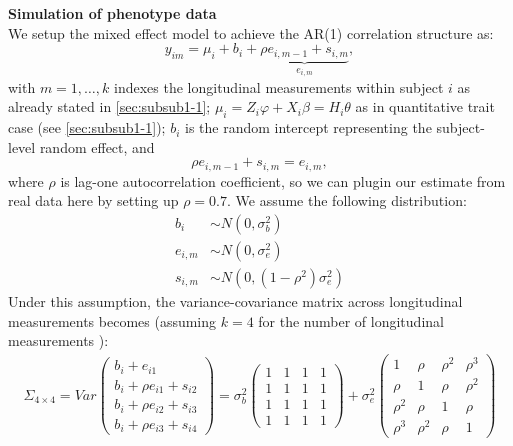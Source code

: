 \documentclass[compress]{beamer}
\begin{document}
\begin{frame}[allowframebreaks]
\framebreak
\textbf{Simulation of phenotype data}\\
We setup the mixed effect model to achieve the AR(1) correlation structure as:\\
\begin{equation}
y_{im} = \mu_{i} + b_i + \underbrace{ \rho e_{i,m-1} + s_{i,m} }_{ e_{i,m} }  ,
\label{eq:y_im_split}
\end{equation}
with $m = 1,\ldots,k$ indexes the longitudinal measurements within subject $i$ as already stated in \ref{sec:subsub1-1}; $\mu_{i} = Z_i \varphi + X_i \beta = H_i \theta$ as in quantitative trait case (see \ref{sec:subsub1-1}); $b_i$ is the random intercept representing the subject-level random effect, and
$$
\rho e_{i,m-1} + s_{i,m} = e_{i,m},
$$ 
where $\rho$ is lag-one autocorrelation coefficient, so we can plugin our estimate from real data here by setting up $\rho = 0.7$. We assume the following distribution:\\
\begin{align*}
b_i & \sim N(0,\sigma_b^2)\\
e_{i,m} & \sim  N(0, \sigma_e^2)\\
s_{i,m} & \sim  N(0, (1 - \rho^2) \sigma_e^2 )
\end{align*}
Under this assumption, the variance-covariance matrix across longitudinal measurements becomes (assuming $k = 4$ for the number of longitudinal measurements ):
\begin{eqnarray}
\Sigma_{4\times 4} = Var 
\begin{pmatrix}
b_i + e_{i1}\\
b_i + \rho e_{i1} + s_{i2}\\
b_i + \rho e_{i2} + s_{i3}\\
b_i + \rho e_{i3} + s_{i4}
\end{pmatrix}
= \sigma_b^2
\begin{pmatrix}
1 & 1 & 1 & 1\\
1 & 1 & 1 & 1\\
1 & 1 & 1 & 1\\
1 & 1 & 1 & 1
\end{pmatrix}
+ \sigma_e^2 
\begin{pmatrix}
1 & \rho & \rho^2 & \rho^3 \\
\rho & 1 & \rho & \rho^2 \\
\rho^2 & \rho & 1 & \rho \\
\rho^3 & \rho^2 & \rho & 1
\end{pmatrix}
\label{eq:v-cov_split}
\end{eqnarray}


\end{frame}
\end{document}
